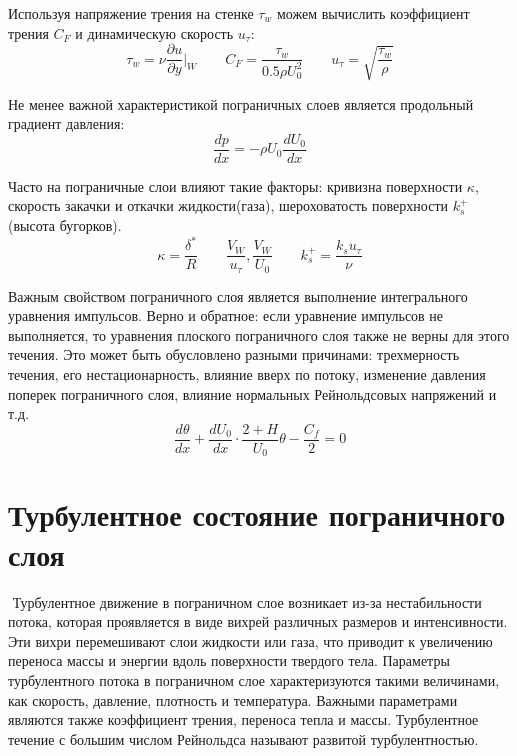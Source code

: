 	Используя напряжение трения на стенке $\tau_w$ можем вычислить коэффициент трения $C_F$ и динамическую скорость $u_\tau$:
	\begin{equation}
		\tau_w = \nu\frac{\partial u}{\partial y}\bigg|_W \qquad C_F = \frac{\tau_w}{0.5\rho U_0^2} \qquad u_\tau = \sqrt{\frac{\tau_w}{\rho}}
	\end{equation}
	
	Не менее важной характеристикой пограничных слоев является продольный градиент давления:
	\begin{equation}
		\frac{dp}{dx} = -\rho U_0 \frac{dU_0}{dx}
	\end{equation}
	
	Часто на пограничные слои влияют такие факторы: кривизна поверхности $\kappa$, скорость закачки и откачки жидкости(газа), шероховатость поверхности $k_s^+$(высота бугорков).
	\begin{equation}
		\kappa = \frac{\delta^*}{R} \qquad \frac{V_W}{u_\tau}, \frac{V_W}{U_0} \qquad k_s^+ = \frac{k_s u_\tau}{\nu}
	\end{equation}
	
	Важным свойством пограничного слоя является выполнение интегрального уравнения импульсов. Верно и обратное: если уравнение импульсов не выполняется, то уравнения плоского пограничного слоя также не верны для этого течения. Это может быть обусловлено разными причинами: трехмерность течения, его нестационарность, влияние вверх по потоку, изменение давления поперек пограничного слоя, влияние нормальных Рейнольдсовых напряжений и т.д.
	\begin{equation}
		\frac{d\theta}{dx} + \frac{dU_0}{dx}\cdot\frac{2 + H}{U_0}\theta - \frac{C_f}{2} = 0
	\end{equation}

\section{Турбулентное состояние пограничного слоя}
‍
	Турбулентное движение в пограничном слое возникает из-за нестабильности потока, которая проявляется в виде вихрей различных размеров и интенсивности. Эти вихри перемешивают слои жидкости или газа, что приводит к увеличению переноса массы и энергии вдоль поверхности твердого тела. Параметры турбулентного потока в пограничном слое характеризуются такими величинами, как скорость, давление, плотность и температура. Важными параметрами являются также коэффициент трения, переноса тепла и массы. Турбулентное течение с большим числом Рейнольдса называют развитой турбулентностью.
	
